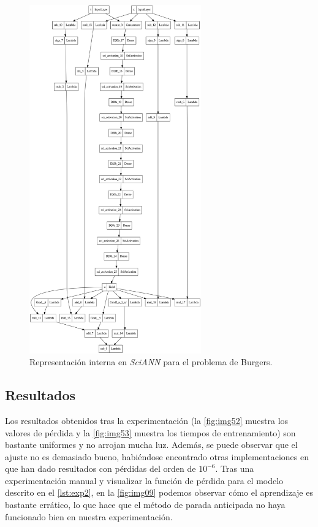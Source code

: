 \begin{figure}[htbp]
    \centering
    \includegraphics[width=0.66\textwidth]{img/burgers.png}
    \caption{Representación interna en \textit{SciANN} para el problema de Burgers.}
    \label{fig:burgers}
\end{figure}


\subsection{Resultados}

Los resultados obtenidos tras la experimentación (la \autoref{fig:img52} muestra los valores de pérdida y la \autoref{fig:img53} muestra los tiempos de entrenamiento) son bastante uniformes y no arrojan mucha luz. Además, se puede observar que el ajuste no es demasiado bueno, habiéndose encontrado otras implementaciones en~\cite{Haghighat2021} que han dado resultados con pérdidas del orden de $10^{-6}$. Tras una experimentación manual y visualizar la función de pérdida para el modelo descrito en el \autoref{lst:exp2}, en la \autoref{fig:img09} podemos observar cómo el aprendizaje es bastante errático, lo que hace que el método de parada anticipada no haya funcionado bien en nuestra experimentación. 



